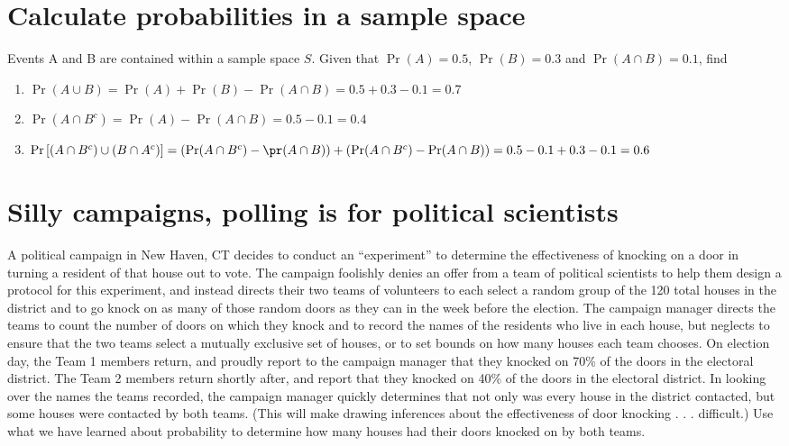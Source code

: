\documentclass[12pt]{article}
\begin{document}
 \section{Calculate probabilities in a sample space }

 Events A and B are contained within a sample space $S$. Given that $\Pr(A) = 0.5$, $\Pr(B) = 0.3$ and $\Pr(A \cap B) = 0.1$, find
 \begin{enumerate}
     \item $\Pr(A \cup B) = \Pr(A) + \Pr(B) - \Pr(A\cap B) = 0.5+0.3-0.1=0.7$
     \item $\Pr(A \cap B^c) =\Pr(A) - \Pr(A \cap B) = 0.5 - 0.1 = 0.4$
     \item $\Pr\left[(A \cap B^c) \cup (B \cap A^c)\right] =\left(\Pr(A \cap B^c) - \pr(A \cap B)\right) + \left(\Pr(A \cap B^c)-\Pr(A \cap B)\right) = 0.5 - 0.1 + 0.3 - 0.1 = 0.6 $
 \end{enumerate}

\section{Silly campaigns, polling is for political scientists}
A political campaign in New Haven, CT decides to conduct an “experiment” to determine the effectiveness of
knocking on a door in turning a resident of that house out to vote. The campaign foolishly denies an offer
from a team of political scientists to help them design a protocol for this experiment, and instead directs
their two teams of volunteers to each select a random group of the 120 total houses in the district and to go
knock on as many of those random doors as they can in the week before the election. The campaign manager
directs the teams to count the number of doors on which they knock and to record the names of the residents
who live in each house, but neglects to ensure that the two teams select a mutually exclusive set of houses, or
to set bounds on how many houses each team chooses.
On election day, the Team 1 members return, and proudly report to the campaign manager that they knocked
on 70\% of the doors in the electoral district. The Team 2 members return shortly after, and report that they
knocked on 40\% of the doors in the electoral district. In looking over the names the teams recorded, the
campaign manager quickly determines that not only was every house in the district contacted, but some
houses were contacted by both teams. (This will make drawing inferences about the effectiveness of door
knocking . . . difficult.)
Use what we have learned about probability to determine how many houses had their doors knocked on by
both teams.
\end{document}

